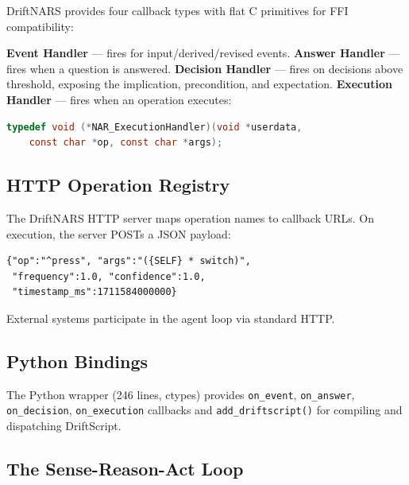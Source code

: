 \documentclass[11pt,a4paper]{article}
\begin{document}
DriftNARS provides four callback types with flat C primitives for FFI
compatibility:

\textbf{Event Handler} --- fires for input/derived/revised events.
\textbf{Answer Handler} --- fires when a question is answered.
\textbf{Decision Handler} --- fires on decisions above threshold, exposing
the implication, precondition, and expectation.
\textbf{Execution Handler} --- fires when an operation executes:

\begin{lstlisting}[language=C]
typedef void (*NAR_ExecutionHandler)(void *userdata,
    const char *op, const char *args);
\end{lstlisting}

\subsection{HTTP Operation Registry}

The DriftNARS HTTP server maps operation names to callback URLs. On execution,
the server POSTs a JSON payload:

\begin{lstlisting}[language={}]
{"op":"^press", "args":"({SELF} * switch)",
 "frequency":1.0, "confidence":1.0,
 "timestamp_ms":1711584000000}
\end{lstlisting}

External systems participate in the agent loop via standard HTTP.

\subsection{Python Bindings}

The Python wrapper (246 lines, ctypes) provides \texttt{on\_event},
\texttt{on\_answer}, \texttt{on\_decision}, \texttt{on\_execution} callbacks
and \texttt{add\_driftscript()} for compiling and dispatching DriftScript.

\subsection{The Sense-Reason-Act Loop}
\end{document}
